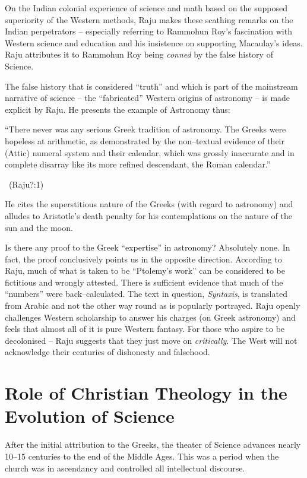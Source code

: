 On the Indian colonial experience of science and math based on the supposed superiority of the Western methods, Raju makes these scathing remarks on the Indian perpetrators – especially referring to Rammohun Roy’s fascination with Western science and education and his insistence on supporting Macaulay’s ideas. Raju attributes it to Rammohun Roy being \textit{conned} by the false history of Science.

The false history that is considered “truth” and which is part of the mainstream narrative of science – the “fabricated” Western origins of astronomy – is made explicit by Raju. He presents the example of Astronomy thus:

\begin{myquote}
“There never was any serious Greek tradition of astronomy. The Greeks were hopeless at arithmetic, as demonstrated by the non–textual evidence of their (Attic) numeral system and their calendar, which was grossly inaccurate and in complete disarray like its more refined descendant, the Roman calendar.” 

~\hfill (Raju?:1)
\end{myquote}

He cites the superstitious nature of the Greeks (with regard to astronomy) and alludes to Aristotle’s death penalty for his contemplations on the nature of the sun and the moon.

Is there any proof to the Greek “expertise” in astronomy? Absolutely none. In fact, the proof conclusively points us in the opposite direction. According to Raju, much of what is taken to be “Ptolemy’s work” can be considered to be fictitious and wrongly attested. There is sufficient evidence that much of the “numbers” were back–calculated. The text in question, \textit{Syntaxis}, is translated from Arabic and not the other way round as is popularly portrayed. Raju openly challenges Western scholarship to answer his charges (on Greek astronomy) and feels that almost all of it is pure Western fantasy. For those who aspire to be decolonised – Raju suggests that they just move on \textit{critically}. The West will not acknowledge their centuries of dishonesty and falsehood.


\section*{Role of Christian Theology in the Evolution of Science}

After the initial attribution to the Greeks, the theater of Science advances nearly 10–15 centuries to the end of the Middle Ages. This was a period when the church was in ascendancy and controlled all intellectual discourse.


